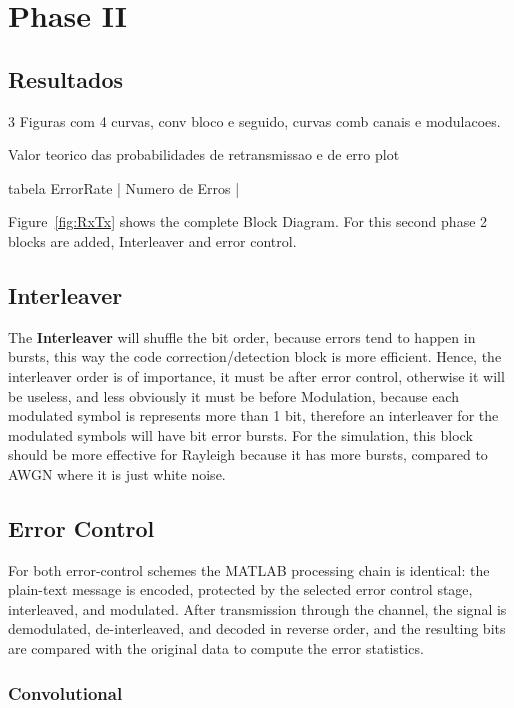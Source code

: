\section{Phase II}
\label{sec:phase2}




\subsection{Resultados}

3 Figuras com 4 curvas, conv bloco e seguido, curvas comb canais e modulacoes.

Valor teorico das probabilidades de retransmissao e de erro plot

tabela ErrorRate | Numero de Erros | 




Figure~\ref{fig:RxTx} shows the complete Block Diagram. For this second phase 2 blocks are added, Interleaver and error control. 

\subsection{Interleaver}

The \textbf{Interleaver} will shuffle the bit order, because errors tend to happen in bursts, this way the code correction/detection block is more efficient. Hence, the interleaver order is of importance, it must be after error control, otherwise it will be useless, and less obviously it must be before Modulation, because each modulated symbol is represents more than 1 bit, therefore an interleaver for the modulated symbols will have bit error bursts. For the simulation, this block should be more effective for Rayleigh because it has more bursts, compared to AWGN where it is just white noise. 

\subsection{Error Control}

For both error-control schemes the MATLAB processing chain is identical: the plain-text message is encoded, protected by the selected error control stage, interleaved, and modulated. After transmission through the channel, the signal is demodulated, de-interleaved, and decoded in reverse order, and the resulting bits are compared with the original data to compute the error statistics.

\subsubsection{Convolutional}

